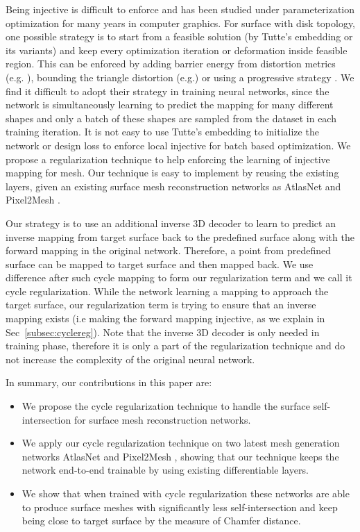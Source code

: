 Being injective is difficult to enforce and has been studied under parameterization optimization for many years in computer graphics. For surface with disk topology, one possible strategy is to start from a feasible solution (by Tutte's embedding \cite{tutte} or its variants) and keep every optimization iteration or deformation inside feasible region. This can be enforced by adding barrier energy from distortion metrics (e.g. \cite{provableplanarmapping,lifted_bijection}), bounding the triangle distortion (e.g.\cite{freeboundary,boundeddistortion})
or using a progressive strategy \cite{Liu_PP_2018}.
We find it difficult to adopt their strategy in training neural networks, since the network is simultaneously learning to predict the mapping for many different shapes and only a batch of these shapes are sampled from the dataset in each training iteration. It is not easy to use Tutte's embedding to initialize the network or design loss to enforce local injective for batch based optimization. We propose a regularization technique to help enforcing the learning of injective mapping for mesh. Our technique is easy to implement by reusing the existing layers, given an existing surface mesh reconstruction networks as AtlasNet \cite{atlasnet} and Pixel2Mesh \cite{pixel2mesh}.

 Our strategy is to use an additional inverse 3D decoder to learn to predict an inverse mapping from target surface back to the predefined surface along with the forward mapping in the original network. Therefore, a point from predefined surface can be mapped to target surface and then mapped back. We use difference after such cycle mapping to form our regularization term and we call it cycle regularization. While the network learning a mapping to approach the target surface, our regularization term is trying to ensure that an inverse mapping exists (i.e making the forward mapping injective, as we explain in Sec~\ref{subsec:cyclereg}).
Note that the inverse 3D decoder is only needed in training phase, therefore it is only a part of the regularization technique and do not increase the complexity of the original neural network.

In summary, our contributions in this paper are:
\begin{itemize}
	\item We propose the cycle regularization technique to handle the surface self-intersection for surface mesh reconstruction networks. 
	\item We apply our cycle regularization technique on two latest mesh generation networks AtlasNet \cite{atlasnet} and Pixel2Mesh \cite{pixel2mesh}, showing that our technique keeps the network end-to-end trainable by using existing differentiable layers.
	\item We show that when trained with cycle regularization these networks are able to produce surface meshes with significantly less self-intersection and keep being close to target surface by the measure of Chamfer distance.
\end{itemize}




 